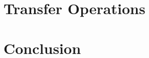 \documentclass[letterpaper,12pt]{article}
\begin{document}
\clearpage

\section{Transfer Operations}\label{sec:transfer}

\clearpage

\section{Conclusion}\label{sec:conc}

\pagebreak


\end{document}
